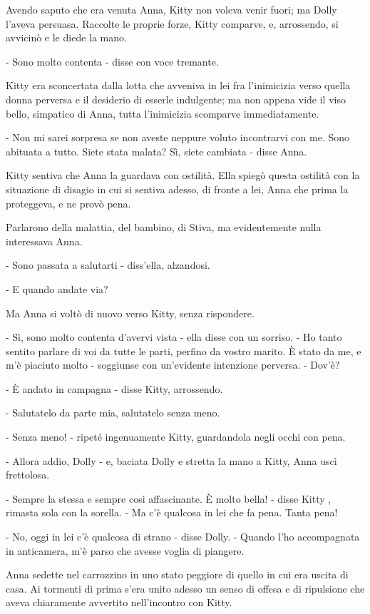Avendo saputo che era venuta Anna, Kitty non voleva venir fuori; ma Dolly l'aveva persuasa. Raccolte le proprie forze, Kitty comparve, e, arrossendo, si avvicinò e le diede la mano. 

- Sono molto contenta - disse con voce tremante. 

Kitty era sconcertata dalla lotta che avveniva in lei fra l'inimicizia verso quella donna perversa e il desiderio di esserle indulgente; ma non appena vide il viso bello, simpatico di Anna, tutta l'inimicizia scomparve immediatamente. 

- Non mi sarei sorpresa se non aveste neppure voluto incontrarvi con me. Sono abituata a tutto. Siete stata malata? Sì, siete cambiata - disse Anna. 

Kitty sentiva che Anna la guardava con ostilità. Ella spiegò questa ostilità con la situazione di disagio in cui si sentiva adesso, di fronte a lei, Anna che prima la proteggeva, e ne provò pena. 

Parlarono della malattia, del bambino, di Stiva, ma evidentemente nulla interessava Anna. 

- Sono passata a salutarti - diss'ella, alzandosi. 

- E quando andate via? 

Ma Anna si voltò di nuovo verso Kitty, senza rispondere. 

- Sì, sono molto contenta d'avervi vista - ella disse con un sorriso. - Ho tanto sentito parlare di voi da tutte le parti, perfino da vostro marito. È stato da me, e m'è piaciuto molto - soggiunse con un'evidente intenzione perversa. - Dov'è? 

- È andato in campagna - disse Kitty, arrossendo. 

- Salutatelo da parte mia, salutatelo senza meno. 

- Senza meno! - ripeté ingenuamente Kitty, guardandola negli occhi con pena. 

- Allora addio, Dolly - e, baciata Dolly e stretta la mano a Kitty, Anna uscì frettolosa. 

- Sempre la stessa e sempre così affascinante. È molto bella! - disse Kitty , rimasta sola con la sorella. - Ma c'è qualcosa in lei che fa pena. Tanta pena! 

- No, oggi in lei c'è qualcosa di strano - disse Dolly. - Quando l'ho accompagnata in anticamera, m'è parso che avesse voglia di piangere. 

\label{xxix-5} 

Anna sedette nel carrozzino in uno stato peggiore di quello in cui era uscita di casa. Ai tormenti di prima s'era unito adesso un senso di offesa e di ripulsione che aveva chiaramente avvertito nell'incontro con Kitty. 


